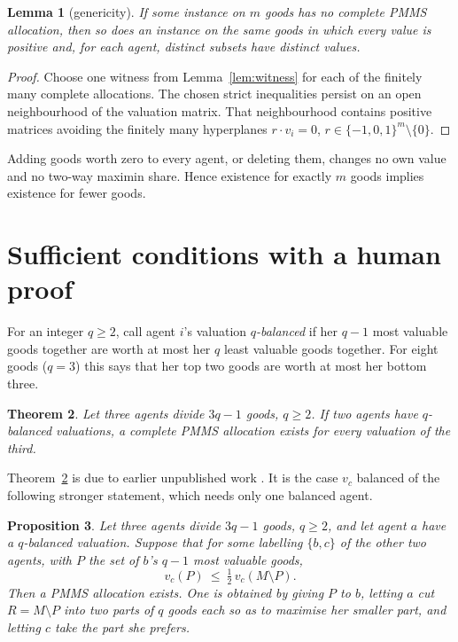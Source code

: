 \documentclass[11pt,a4paper]{article}
\newtheorem{theorem}{Theorem}
\newtheorem{proposition}[theorem]{Proposition}
\newtheorem{lemma}[theorem]{Lemma}
\theoremstyle{remark}
\begin{document}
\begin{lemma}[genericity]\label{lem:generic}
If some instance on $m$ goods has no complete PMMS allocation, then so does an instance on the same goods in which every value is positive and, for each agent, distinct subsets have distinct values.
\end{lemma}
\begin{proof}
Choose one witness from Lemma~\ref{lem:witness} for each of the finitely many complete allocations. The chosen strict inequalities persist on an open neighbourhood of the valuation matrix. That neighbourhood contains positive matrices avoiding the finitely many hyperplanes $r\cdot v_i=0$, $r\in\{-1,0,1\}^m\setminus\{0\}$.
\end{proof}

Adding goods worth zero to every agent, or deleting them, changes no own value and no two-way maximin share. Hence existence for exactly $m$ goods implies existence for fewer goods.

\section{Sufficient conditions with a human proof}\label{sec:sufficient}

For an integer $q\ge2$, call agent $i$'s valuation \emph{$q$-balanced} if her $q-1$ most valuable goods together are worth at most her $q$ least valuable goods together. For eight goods ($q=3$) this says that her top two goods are worth at most her bottom three.

\begin{theorem}\label{thm:card}
Let three agents divide $3q-1$ goods, $q\ge 2$. If two agents have $q$-balanced valuations, a complete PMMS allocation exists for every valuation of the third.
\end{theorem}

Theorem~\ref{thm:card} is due to earlier unpublished work \cite{AnonMemo}. It is the case $v_c$ balanced of the following stronger statement, which needs only one balanced agent.

\begin{proposition}\label{prop:onerow}
Let three agents divide $3q-1$ goods, $q\ge2$, and let agent $a$ have a $q$-balanced valuation. Suppose that for some labelling $\{b,c\}$ of the other two agents, with $P$ the set of $b$'s $q-1$ most valuable goods,
\[
v_c(P)\ \le\ \tfrac12\, v_c(M\setminus P).
\]
Then a PMMS allocation exists. One is obtained by giving $P$ to $b$, letting $a$ cut $R=M\setminus P$ into two parts of $q$ goods each so as to maximise her smaller part, and letting $c$ take the part she prefers.
\end{proposition}
\end{document}
